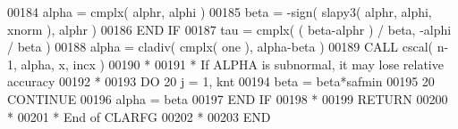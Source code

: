 \begin{DoxyCode}
00184             alpha = cmplx( alphr, alphi )
00185             beta = -sign( slapy3( alphr, alphi, xnorm ), alphr )
00186 \textcolor{keywordflow}{         END IF}
00187          tau = cmplx( ( beta-alphr ) / beta, -alphi / beta )
00188          alpha = cladiv( cmplx( one ), alpha-beta )
00189          \textcolor{keyword}{CALL }cscal( n-1, alpha, x, incx )
00190 \textcolor{comment}{*}
00191 \textcolor{comment}{*        If ALPHA is subnormal, it may lose relative accuracy}
00192 \textcolor{comment}{*}
00193          \textcolor{keywordflow}{DO} 20 j = 1, knt
00194             beta = beta*safmin
00195  20      \textcolor{keywordflow}{CONTINUE}
00196          alpha = beta
00197 \textcolor{keywordflow}{      END IF}
00198 \textcolor{comment}{*}
00199       \textcolor{keywordflow}{RETURN}
00200 \textcolor{comment}{*}
00201 \textcolor{comment}{*     End of CLARFG}
00202 \textcolor{comment}{*}
00203 \textcolor{keyword}{      END}
\end{DoxyCode}
